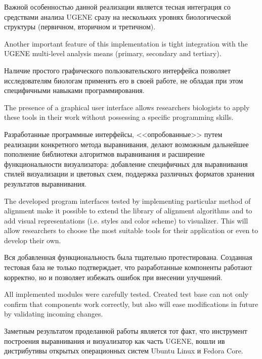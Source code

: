 \documentclass[a4paper, 12pt, titlepage, utf8]{extarticle}
\begin{document}
\begin{original}
\begin{original}
\begin{original}
Важной особенностью данной реализации является тесная интеграция со средствами
анализа UGENE сразу на нескольких уровнях биологической структуры (первичном,
вторичном и третичном).
\end{original}

Another important feature of this implementation is tight integration with the
UGENE multi-level analysis means (primary, secondary and tertiary).

\begin{original}
Наличие простого графического пользовательского интерфейса позволяет
исследователям биологам применять его в своей работе, не обладая при этом
специфичными навыками программирования.
\end{original}

The presence of a graphical user interface allows researchers biologists to
apply these tools in their work without possessing a specific programming
skills.

\begin{original}
Разработанные программные интерфейсы, <<опробованные>> путем реализации
конкретного метода выравнивания, делают возможным дальнейшее пополнение
библиотеки алгоритмов выравнивания и расширение функциональности визуализатора:
добавление специфичных для выравнивания стилей визуализации и цветовых схем,
поддержка различных форматов хранения результатов выравнивания.
\end{original}

The developed program interfaces tested by implementing particular method of
alignment make it possible to extend the library of alignment algorithms and to add
visual representations (i.e. styles and color scheme) to visualizer. This will
allow researchers to choose the most suitable tools for their application or even to
develop their own.

\begin{original}
Вся добавленная функциональность была тщательно протестирована. Созданная
тестовая база не только подтверждает, что разработанные компоненты работают
корректно, но и позволяет избежать ошибок при внесении улучшений.
\end{original}

All implemented modules were carefully tested. Created test base can not only
confirm that components work correctly, but also will ease modifications in
future by validating incoming changes.

\begin{original}
Заметным результатом проделанной работы является тот факт, что инструмент
построения выравнивания и визуализатор как часть UGENE, вошли ив дистрибутивы
открытых операционных систем Ubuntu Linux и Fedora Core.
\end{original}


\end{original}
\end{original}
\end{document}

